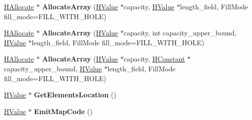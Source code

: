 \begin{DoxyCompactItemize}
\item 
\hyperlink{classv8_1_1internal_1_1_h_allocate}{H\+Allocate} $\ast$ {\bfseries Allocate\+Array} (\hyperlink{classv8_1_1internal_1_1_h_value}{H\+Value} $\ast$capacity, \hyperlink{classv8_1_1internal_1_1_h_value}{H\+Value} $\ast$length\+\_\+field, Fill\+Mode fill\+\_\+mode=F\+I\+L\+L\+\_\+\+W\+I\+T\+H\+\_\+\+H\+O\+LE)\hypertarget{classv8_1_1internal_1_1_h_graph_builder_1_1_j_s_array_builder_a8eafb74a7404ebf19c435d5a723456ca}{}\label{classv8_1_1internal_1_1_h_graph_builder_1_1_j_s_array_builder_a8eafb74a7404ebf19c435d5a723456ca}

\item 
\hyperlink{classv8_1_1internal_1_1_h_allocate}{H\+Allocate} $\ast$ {\bfseries Allocate\+Array} (\hyperlink{classv8_1_1internal_1_1_h_value}{H\+Value} $\ast$capacity, int capacity\+\_\+upper\+\_\+bound, \hyperlink{classv8_1_1internal_1_1_h_value}{H\+Value} $\ast$length\+\_\+field, Fill\+Mode fill\+\_\+mode=F\+I\+L\+L\+\_\+\+W\+I\+T\+H\+\_\+\+H\+O\+LE)\hypertarget{classv8_1_1internal_1_1_h_graph_builder_1_1_j_s_array_builder_a6ebb196dc5d2fc7c0e032c0ea5d3bf94}{}\label{classv8_1_1internal_1_1_h_graph_builder_1_1_j_s_array_builder_a6ebb196dc5d2fc7c0e032c0ea5d3bf94}

\item 
\hyperlink{classv8_1_1internal_1_1_h_allocate}{H\+Allocate} $\ast$ {\bfseries Allocate\+Array} (\hyperlink{classv8_1_1internal_1_1_h_value}{H\+Value} $\ast$capacity, \hyperlink{classv8_1_1internal_1_1_h_constant}{H\+Constant} $\ast$capacity\+\_\+upper\+\_\+bound, \hyperlink{classv8_1_1internal_1_1_h_value}{H\+Value} $\ast$length\+\_\+field, Fill\+Mode fill\+\_\+mode=F\+I\+L\+L\+\_\+\+W\+I\+T\+H\+\_\+\+H\+O\+LE)\hypertarget{classv8_1_1internal_1_1_h_graph_builder_1_1_j_s_array_builder_a3c078a2ace42eca1a46b6f00754a167b}{}\label{classv8_1_1internal_1_1_h_graph_builder_1_1_j_s_array_builder_a3c078a2ace42eca1a46b6f00754a167b}

\item 
\hyperlink{classv8_1_1internal_1_1_h_value}{H\+Value} $\ast$ {\bfseries Get\+Elements\+Location} ()\hypertarget{classv8_1_1internal_1_1_h_graph_builder_1_1_j_s_array_builder_acc4839153f8d4f74be3a76c57fb11f14}{}\label{classv8_1_1internal_1_1_h_graph_builder_1_1_j_s_array_builder_acc4839153f8d4f74be3a76c57fb11f14}

\item 
\hyperlink{classv8_1_1internal_1_1_h_value}{H\+Value} $\ast$ {\bfseries Emit\+Map\+Code} ()\hypertarget{classv8_1_1internal_1_1_h_graph_builder_1_1_j_s_array_builder_ac8f687ed1cd58c620a1607d372b6040f}{}\label{classv8_1_1internal_1_1_h_graph_builder_1_1_j_s_array_builder_ac8f687ed1cd58c620a1607d372b6040f}

\end{DoxyCompactItemize}
